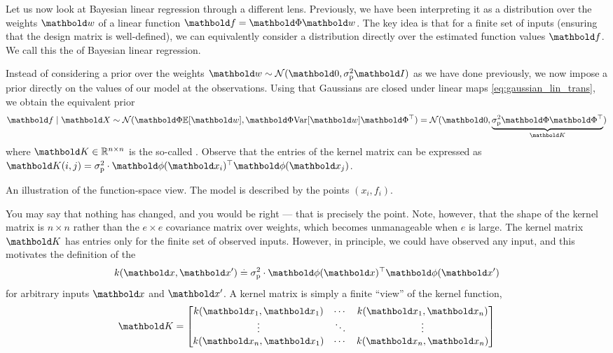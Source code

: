 Let us now look at Bayesian linear regression through a different lens.
Previously, we have been interpreting it as a distribution over the weights $\vw$ of a linear function $\vf = \mPhi \vw$.
The key idea is that for a finite set of inputs (ensuring that the design matrix is well-defined), we can equivalently consider a distribution directly over the estimated function values $\vf$.
We call this the  of Bayesian linear regression.

Instead of considering a prior over the weights $\vw \sim \N{\vzero}{\sigmap^2 \mI}$ as we have done previously, we now impose a prior directly on the values of our model at the observations.
Using that Gaussians are closed under linear maps \eqref{eq:gaussian_lin_trans}, we obtain the equivalent prior \begin{align}
  \vf \mid \mX \sim \N{\mPhi \E{\vw}}{\mPhi \Var{\vw} \transpose{\mPhi}} = \N{\vzero} {\underbrace{\sigmap^2 \mPhi \transpose{\mPhi}}_{\mK}} \label{eq:kernel_matrix_defn}
\end{align} where $\mK \in \R^{n \times n}$ is the so-called .
Observe that the entries of the kernel matrix can be expressed as $\mK(i,j) = \sigmap^2 \cdot \transpose{\vphi(\vx_i)} \vphi(\vx_j)$.

\begin{marginfigure}
  \caption{An illustration of the function-space view. The model is described by the points $(x_i, f_i)$.}
\end{marginfigure}

You may say that nothing has changed, and you would be right --- that is precisely the point.
Note, however, that the shape of the kernel matrix is $n \times n$ rather than the $e \times e$ covariance matrix over weights, which becomes unmanageable when $e$ is large.
The kernel matrix $\mK$ has entries only for the finite set of observed inputs.
However, in principle, we could have observed any input, and this motivates the definition of the  \begin{align}
  k(\vx, \vxp) \defeq \sigmap^2 \cdot \transpose{\vphi(\vx)} \vphi(\vxp) \label{eq:blr_kernel}
\end{align} for arbitrary inputs $\vx$ and $\vxp$.
A kernel matrix is simply a finite ``view'' of the kernel function, \begin{align}
  \mK = \begin{bmatrix}
    k(\vx_1, \vx_1) & \cdots & k(\vx_1, \vx_n) \\
    \vdots & \ddots & \vdots \\
    k(\vx_n, \vx_1) & \cdots & k(\vx_n, \vx_n) \\
  \end{bmatrix}
\end{align}

